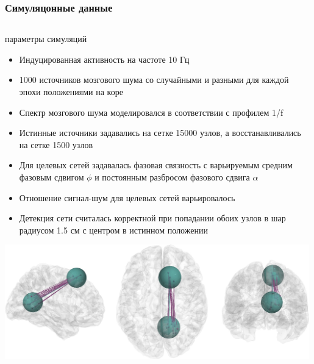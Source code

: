 \documentclass[12pt]{beamer}
\begin{document}
\begin{frame}[t]
    \frametitle{Симуляцонные данные}
    \begin{columns}
        \begin{column}{0.6\textwidth}
            \begin{block}{ параметры симуляций}
                \begin{itemize}
                    \tiny
                    \item Индуцированная активность на частоте 10 Гц
                    \item 1000 источников мозгового шума со случайными и разными
                        для каждой эпохи положениями на коре
                    \item Спектр мозгового шума моделировался в соответствии с профилем 1/f
                    \item Истинные источники задавались на сетке 15000 узлов,
                        а восстанавливались на сетке 1500 узлов
                    \item Для целевых сетей задавалась фазовая связность с варьируемым
                        средним фазовым сдвигом $\phi$ и постоянным разбросом фазового сдвига $\alpha$
                    \item Отношение сигнал-шум для целевых сетей варьировалось
                    \item Детекция сети считалась корректной при попадании обоих узлов
                        в шар радиусом 1.5 см с центром в истинном положении
                \end{itemize}
            \includegraphics[width=0.99\textwidth]{../images/bias_brain_PSIICOS_Unbiased.jpg}
            \end{block}
            

\end{column}
\end{columns}
\end{frame}
\end{document}
